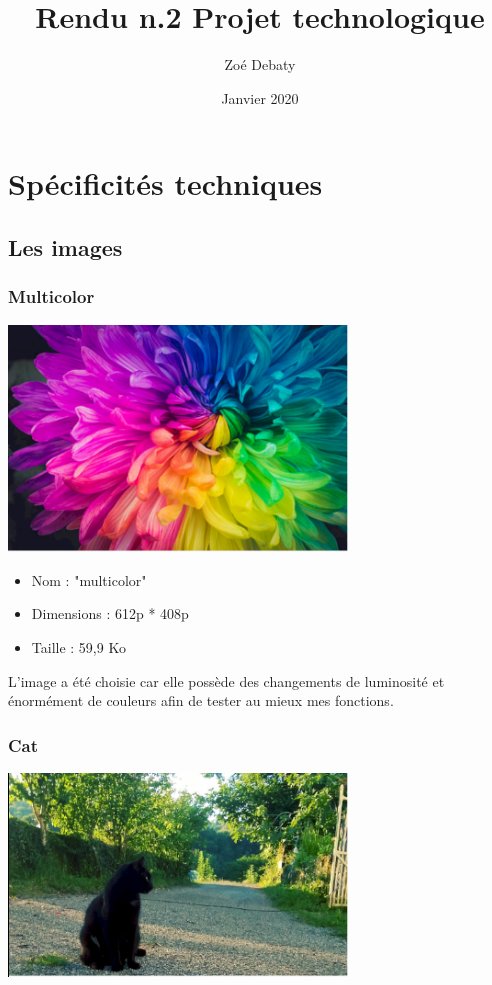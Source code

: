 \documentclass{article}
\title{Rendu n.2 Projet technologique}
\author{Zoé Debaty}
\date{Janvier 2020}
\begin{document}
\maketitle
\tableofcontents 
\newpage

\section{Spécificités techniques}

\subsection{Les images}
\subsubsection{Multicolor}
\begin{center} 
    \includegraphics[width=9cm]{../Image_fonctions/Multicolor/Base.PNG}
\end{center}
\bigbreak

\begin{itemize}
\item Nom : "multicolor"
\item Dimensions : 612p * 408p
\item Taille : 59,9 Ko
\end{itemize}
\medbreak

L'image a été choisie car elle possède des changements de luminosité et énormément de couleurs afin de tester au mieux mes fonctions.

\subsubsection{Cat}
\begin{center} 
    \includegraphics[width=9cm]{../Image_fonctions/Cat/Base.PNG}
\end{center}
\bigbreak
\end{document}
